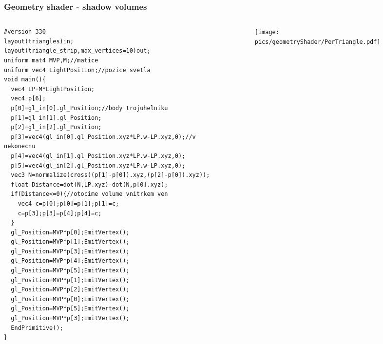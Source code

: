 \begin{frame}[fragile]
\frametitle{Geometry shader - shadow volumes}
  \begin{columns}[T]
    \begin{column}{.44\textwidth}
	    {\tiny
      	\begin{verbatim}
#version 330
layout(triangles)in;
layout(triangle_strip,max_vertices=10)out;
uniform mat4 MVP,M;//matice
uniform vec4 LightPosition;//pozice svetla
void main(){
  vec4 LP=M*LightPosition;
  vec4 p[6];
  p[0]=gl_in[0].gl_Position;//body trojuhelniku
  p[1]=gl_in[1].gl_Position;
  p[2]=gl_in[2].gl_Position;
  p[3]=vec4(gl_in[0].gl_Position.xyz*LP.w-LP.xyz,0);//v nekonecnu
  p[4]=vec4(gl_in[1].gl_Position.xyz*LP.w-LP.xyz,0);
  p[5]=vec4(gl_in[2].gl_Position.xyz*LP.w-LP.xyz,0);
  vec3 N=normalize(cross((p[1]-p[0]).xyz,(p[2]-p[0]).xyz));
  float Distance=dot(N,LP.xyz)-dot(N,p[0].xyz);
  if(Distance<=0){//otocime volume vnitrkem ven
    vec4 c=p[0];p[0]=p[1];p[1]=c;
    c=p[3];p[3]=p[4];p[4]=c;
  }
  gl_Position=MVP*p[0];EmitVertex();
  gl_Position=MVP*p[1];EmitVertex();
  gl_Position=MVP*p[3];EmitVertex();
  gl_Position=MVP*p[4];EmitVertex();
  gl_Position=MVP*p[5];EmitVertex();
  gl_Position=MVP*p[1];EmitVertex();
  gl_Position=MVP*p[2];EmitVertex();
  gl_Position=MVP*p[0];EmitVertex();
  gl_Position=MVP*p[5];EmitVertex();
  gl_Position=MVP*p[3];EmitVertex();
  EndPrimitive();
}
    	\end{verbatim}
   	}
    \end{column}
    \begin{column}{.48\textwidth}
	    \begin{figure}[h]
    		\texttt{[image: pics/geometryShader/PerTriangle.pdf]}
    	\end{figure}
    \end{column}
  \end{columns}

\end{frame}

